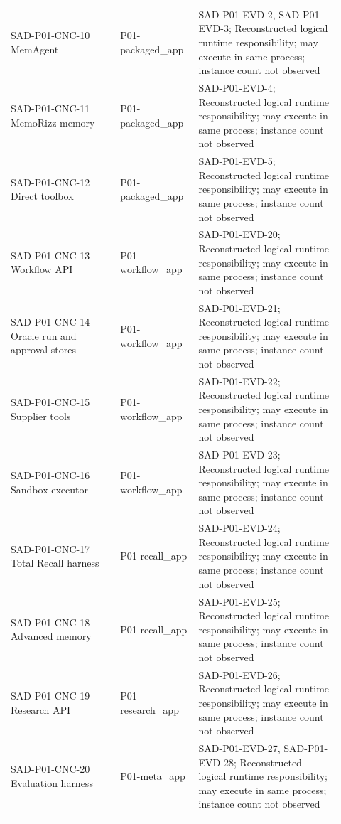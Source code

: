 \documentclass[10pt,letterpaper]{article}
\begin{document}
\begin{longtable}{@{}>{\raggedright\arraybackslash}p{0.31\linewidth}>{\raggedright\arraybackslash}p{0.21\linewidth}>{\raggedright\arraybackslash}p{0.4\linewidth}@{}}
SAD-P01-CNC-10 MemAgent & P01-packaged\_app & SAD-P01-EVD-2, SAD-P01-EVD-3; Reconstructed logical runtime responsibility; may execute in same process; instance count not observed\\\addlinespace
SAD-P01-CNC-11 MemoRizz memory & P01-packaged\_app & SAD-P01-EVD-4; Reconstructed logical runtime responsibility; may execute in same process; instance count not observed\\\addlinespace
SAD-P01-CNC-12 Direct toolbox & P01-packaged\_app & SAD-P01-EVD-5; Reconstructed logical runtime responsibility; may execute in same process; instance count not observed\\\addlinespace
SAD-P01-CNC-13 Workflow API & P01-workflow\_app & SAD-P01-EVD-20; Reconstructed logical runtime responsibility; may execute in same process; instance count not observed\\\addlinespace
SAD-P01-CNC-14 Oracle run and approval stores & P01-workflow\_app & SAD-P01-EVD-21; Reconstructed logical runtime responsibility; may execute in same process; instance count not observed\\\addlinespace
SAD-P01-CNC-15 Supplier tools & P01-workflow\_app & SAD-P01-EVD-22; Reconstructed logical runtime responsibility; may execute in same process; instance count not observed\\\addlinespace
SAD-P01-CNC-16 Sandbox executor & P01-workflow\_app & SAD-P01-EVD-23; Reconstructed logical runtime responsibility; may execute in same process; instance count not observed\\\addlinespace
SAD-P01-CNC-17 Total Recall harness & P01-recall\_app & SAD-P01-EVD-24; Reconstructed logical runtime responsibility; may execute in same process; instance count not observed\\\addlinespace
SAD-P01-CNC-18 Advanced memory & P01-recall\_app & SAD-P01-EVD-25; Reconstructed logical runtime responsibility; may execute in same process; instance count not observed\\\addlinespace
SAD-P01-CNC-19 Research API & P01-research\_app & SAD-P01-EVD-26; Reconstructed logical runtime responsibility; may execute in same process; instance count not observed\\\addlinespace
SAD-P01-CNC-20 Evaluation harness & P01-meta\_app & SAD-P01-EVD-27, SAD-P01-EVD-28; Reconstructed logical runtime responsibility; may execute in same process; instance count not observed\\\addlinespace
\bottomrule\end{longtable}
\end{document}
